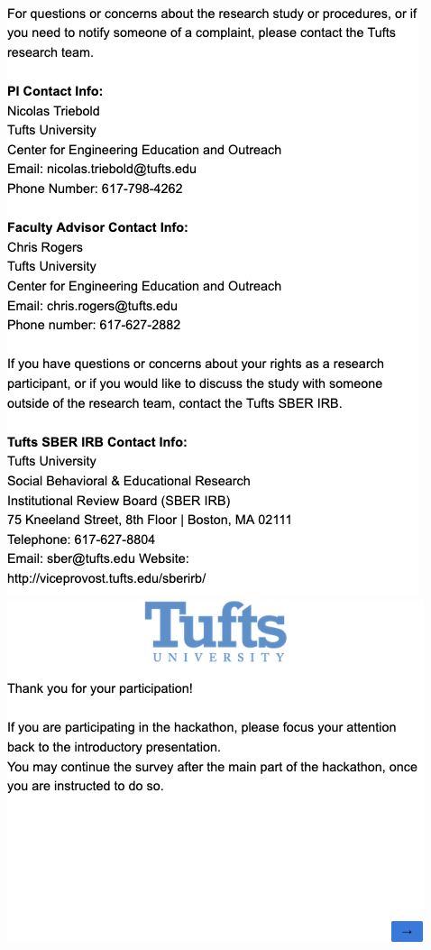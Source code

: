 \begin{multicols}{2}
\includegraphics[width=.75\linewidth]{overleaf/images/q2.png}\\
\vfill
\includegraphics[width=.75\linewidth]{overleaf/images/q3.png}
\newpage

\end{multicols}
